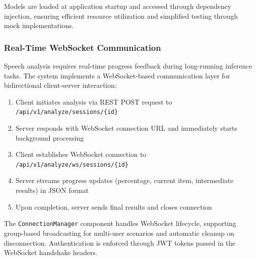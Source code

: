 Models are loaded at application startup and accessed through dependency injection, ensuring efficient resource utilization and simplified testing through mock implementations.

\subsubsection{Real-Time WebSocket Communication}

Speech analysis requires real-time progress feedback during long-running inference tasks. The system implements a WebSocket-based communication layer for bidirectional client-server interaction:

\begin{enumerate}
    \item Client initiates analysis via REST POST request to \texttt{/api/v1/analyze/sessions/\{id\}}
    \item Server responds with WebSocket connection URL and immediately starts background processing
    \item Client establishes WebSocket connection to \texttt{/api/v1/analyze/ws/sessions/\{id\}}
    \item Server streams progress updates (percentage, current item, intermediate results) in JSON format
    \item Upon completion, server sends final results and closes connection
\end{enumerate}

The \texttt{ConnectionManager} component handles WebSocket lifecycle, supporting group-based broadcasting for multi-user scenarios and automatic cleanup on disconnection. Authentication is enforced through JWT tokens passed in the WebSocket handshake headers.

